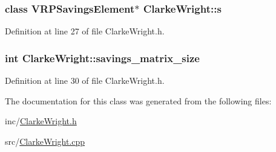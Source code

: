 \hypertarget{class_clarke_wright_a07187d146929ba5f529557d694897404}{
\subsubsection[{s}]{\setlength{\rightskip}{0pt plus 5cm}class {\bf VRPSavingsElement}$\ast$ {\bf ClarkeWright::s}}}
\label{class_clarke_wright_a07187d146929ba5f529557d694897404}


Definition at line 27 of file ClarkeWright.h.

\hypertarget{class_clarke_wright_a9cff11194c4d3a21c589b8ff642a0e71}{
\subsubsection[{savings\_\-matrix\_\-size}]{\setlength{\rightskip}{0pt plus 5cm}int {\bf ClarkeWright::savings\_\-matrix\_\-size}}}
\label{class_clarke_wright_a9cff11194c4d3a21c589b8ff642a0e71}


Definition at line 30 of file ClarkeWright.h.



The documentation for this class was generated from the following files:\begin{DoxyCompactItemize}
\item 
inc/\hyperlink{_clarke_wright_8h}{ClarkeWright.h}\item 
src/\hyperlink{_clarke_wright_8cpp}{ClarkeWright.cpp}\end{DoxyCompactItemize}
